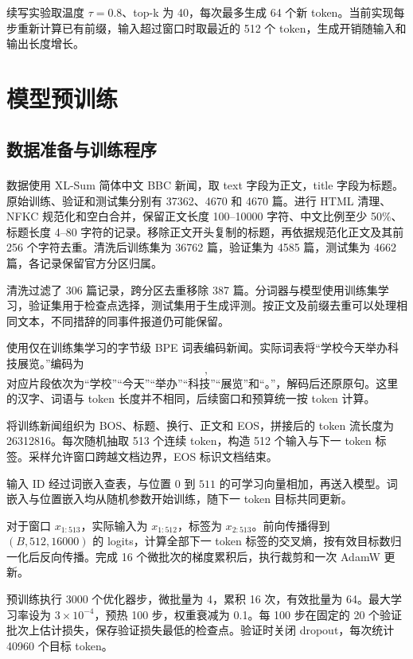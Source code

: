 \documentclass[UTF8,a4paper,12pt,fontset=fandol]{ctexart}
\begin{document}
续写实验取温度 $\tau=0.8$、top-k 为 40，每次最多生成 64 个新 token。当前实现每步重新计算已有前缀，输入超过窗口时取最近的 512 个 token，生成开销随输入和输出长度增长。

\FloatBarrier
\section{模型预训练}
\subsection{数据准备与训练程序}
数据使用 XL-Sum 简体中文 BBC 新闻\textsuperscript{\cite{xlsum}}，取 text 字段为正文，title 字段为标题。原始训练、验证和测试集分别有 37362、4670 和 4670 篇。进行 HTML 清理、NFKC 规范化和空白合并，保留正文长度 100--10000 字符、中文比例至少 50\%、标题长度 4--80 字符的记录。移除正文开头复制的标题，再依据规范化正文及其前 256 个字符去重。清洗后训练集为 36762 篇，验证集为 4585 篇，测试集为 4662 篇，各记录保留官方分区归属。

清洗过滤了 306 篇记录，跨分区去重移除 387 篇。分词器与模型使用训练集学习，验证集用于检查点选择，测试集用于生成评测。按正文及前缀去重可以处理相同文本，不同措辞的同事件报道仍可能保留。

使用仅在训练集学习的字节级 BPE 词表编码新闻。实际词表将“学校今天举办科技展览。”编码为
\begin{equation}
 [1905,\ 2336,\ 3622,\ 2393,\ 5759,\ 264],
\end{equation}
对应片段依次为“学校”“今天”“举办”“科技”“展览”和“。”，解码后还原原句。这里的汉字、词语与 token 长度并不相同，后续窗口和预算统一按 token 计算。

将训练新闻组织为 BOS、标题、换行、正文和 EOS，拼接后的 token 流长度为 26312816。每次随机抽取 513 个连续 token，构造 512 个输入与下一 token 标签。采样允许窗口跨越文档边界，EOS 标识文档结束。

输入 ID 经过词嵌入查表，与位置 $0$ 到 $511$ 的可学习向量相加，再送入模型。词嵌入与位置嵌入均从随机参数开始训练，随下一 token 目标共同更新。

对于窗口 $x_{1:513}$，实际输入为 $x_{1:512}$，标签为 $x_{2:513}$。前向传播得到 $(B,512,16000)$ 的 logits，计算全部下一 token 标签的交叉熵，按有效目标数归一化后反向传播。完成 16 个微批次的梯度累积后，执行裁剪和一次 AdamW 更新。

预训练执行 3000 个优化器步，微批量为 4，累积 16 次，有效批量为 64。最大学习率设为 $3\times10^{-4}$，预热 100 步，权重衰减为 0.1。每 100 步在固定的 20 个验证批次上估计损失，保存验证损失最低的检查点。验证时关闭 dropout，每次统计 40960 个目标 token。
\end{document}
